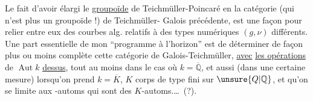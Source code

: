Le fait d'avoir élargi le \uline{groupoïde} de
Teichmüller-Poincaré en la catégorie (qui n'est
plus un groupoïde !) de Teichmüller-
Galois précédente, est une façon  
pour relier entre eux des courbes alg. relatifs
à des types numériques $(g,\nu)$ différents.
Une part essentielle de mon ``programme
à l'horizon'' est de déterminer de façon
plus ou moins complète cette catégorie
de Galois-Teichmüller,  \uline{avec} \uline{les opérations}
de $\operatorname{Aut}k$ \uline{dessus}, tout au moins dans
le cas où $k=\overline{\mathbb Q}$, et aussi (dans une
certaine mesure) lorsqu'on prend 
$k=\overline K$, $K$ corps de type fini sur $\unsure{Q|\mathbb Q}$, et
qu'on se limite aux -automs  qui
sont des $K$-automs.\ldots\ (?).
